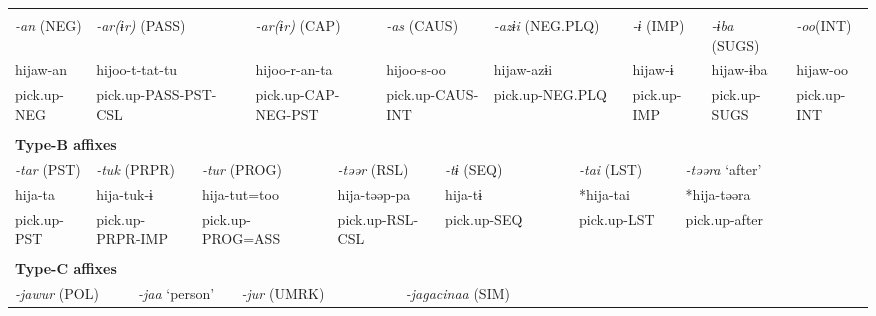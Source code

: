 \tabletail{}
\tablelasttail{}
\begin{tabularx}{\textwidth}{XXXXXXXm{}XXXXXXXXXXX}
\lsptoprule
\multicolumn{19}{X}{{\bfseries Type-A affixes}}\\
{ \textit{{}-an} (NEG)} & \multicolumn{5}{X}{{ \textit{{}-ar(ɨr)} (PASS)}} & \multicolumn{3}{X}{{ \textit{{}-ar(ɨr)} (CAP)}} & \multicolumn{4}{X}{{ \textit{{}-as} (CAUS)}} & \multicolumn{2}{X}{{ \textit{{}-azɨi} (NEG.PLQ)}} & \multicolumn{2}{X}{{ \textit{{}-ɨ} (IMP)}} & { \textit{{}-ɨba} (SUGS)} & { \textit{{}-oo}(INT)}\\
{ hijaw-an} & \multicolumn{5}{X}{{ hijoo-t-tat-tu}} & \multicolumn{3}{X}{{ hijoo-r-an-ta}} & \multicolumn{4}{X}{{ hijoo-s-oo}} & \multicolumn{2}{X}{{ hijaw-azɨi}} & \multicolumn{2}{X}{{ hijaw-ɨ}} & { hijaw-ɨba} & { hijaw-oo}\\
pick.up-NEG & \multicolumn{5}{X}{pick.up-PASS-PST-CSL} & \multicolumn{3}{X}{pick.up-CAP-NEG-PST} & \multicolumn{4}{X}{pick.up-CAUS-INT} & \multicolumn{2}{X}{pick.up-NEG.PLQ} & \multicolumn{2}{X}{pick.up-IMP} & pick.up-SUGS & pick.up-INT\\
\multicolumn{19}{X}{}\\
\multicolumn{19}{X}{{\bfseries Type-B affixes}}\\
{ \textit{{}-tar} (PST)} & \multicolumn{3}{X}{{ \textit{{}-tuk} (PRPR)}} & \multicolumn{4}{X}{{ \textit{{}-tur} (PROG)}} & \multicolumn{4}{X}{{ \textit{{}-təər} (RSL)}} & \multicolumn{2}{X}{{ \textit{{}-tɨ} (SEQ)}} & \multicolumn{2}{X}{{ \textit{{}-tai} (LST)}} & \multicolumn{3}{X}{{ \textit{{}-təəra} ‘after’}}\\
{ hija-ta} & \multicolumn{3}{X}{{ hija-tuk-ɨ}} & \multicolumn{4}{X}{{ hija-tut=too}} & \multicolumn{4}{X}{{ hija-təəp-pa}} & \multicolumn{2}{X}{{ hija-tɨ}} & \multicolumn{2}{X}{{ *hija-tai}} & \multicolumn{3}{X}{{ *hija-təəra}}\\
pick.up-PST & \multicolumn{3}{X}{pick.up-PRPR-IMP} & \multicolumn{4}{X}{pick.up-PROG=ASS} & \multicolumn{4}{X}{pick.up-RSL-CSL} & \multicolumn{2}{X}{pick.up-SEQ} & \multicolumn{2}{X}{pick.up-LST} & \multicolumn{3}{X}{{ pick.up-after}}\\
& \multicolumn{3}{X}{} & \multicolumn{4}{X}{} & \multicolumn{4}{X}{} & \multicolumn{2}{X}{} & \multicolumn{2}{X}{} & \multicolumn{3}{X}{}\\
\multicolumn{19}{X}{{\bfseries Type-C affixes}}\\
\multicolumn{3}{X}{{ \textit{{}-jawur} (POL)}} & \multicolumn{2}{X}{{ \textit{{}-jaa} ‘person’}} & \multicolumn{5}{X}{{ \textit{{}-jur} (UMRK)}} & \multicolumn{9}{X}{{ \textit{{}-jagacinaa} (SIM)}}\\

\end{tabularx}
